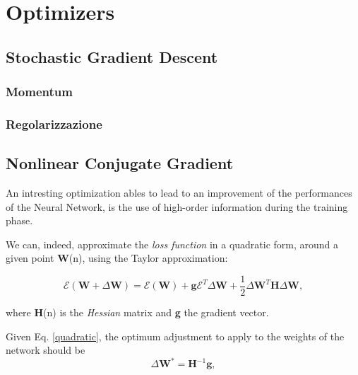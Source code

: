 \chapter{Optimizers} %
\label{cha:optimizers}
	\section{Stochastic Gradient Descent} %
	\label{sec:sgd}
	

		\subsection{Momentum} %
		\label{sec:momentum}
		

		\subsection{Regolarizzazione} %
		\label{sec:regolarizzazione}

	\section{Nonlinear Conjugate Gradient} %
	\label{sec:nonlinear_conjugate_gradient}
	
		An intresting optimization ables to lead to an improvement of the performances of the Neural Network, is the use of high-order information during the training phase.

		We can, indeed, approximate the \textit{loss function} in a quadratic form, around a given point \textbf{W}(n), using the Taylor approximation:

		 \begin{equation} 
		 	\label{quadratic}
		    \mathcal{E}(\textbf{W} + \Delta\textbf{W}) = \mathcal{E}(\textbf{W})+\textbf{g}\mathcal{E}^T\Delta\textbf{W}+ \frac{1}{2}\Delta\textbf{W}^T\textbf{H}\Delta\textbf{W},
		 \end{equation} 

		where \textbf{H}(n) is the \textit{Hessian} matrix and \textbf{g} the gradient vector.

		Given Eq. \ref{quadratic}, the optimum adjustment to apply to the weights of the network should be 
 		\begin{equation} 
		 	\label{weight_star}
			\Delta\textbf{W}^* = \textbf{H}^{-1}\textbf{g},
		\end{equation} 


